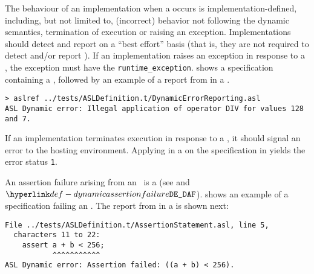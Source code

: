  The behaviour of an implementation when a \dynamicerrorterm{}
occurs is implementation-defined, including, but not limited to,
(incorrect) behavior not following the dynamic semantics, termination of execution or raising an exception.
%
Implementations should detect and report \dynamicerrorsterm{} on a ``best effort'' basis
(that is, they are not required to detect and/or report \dynamicerrorsterm{}).
%
If an implementation raises an exception in response to a \dynamicerrorterm{},
the exception must have the \supertypeterm{}
\verb|runtime_exception|.
%
 shows a specification containing a \dynamicerrorterm{},
followed by an example of a report from \aslref{} in a \linuxbashshell.


\begin{Verbatim}[fontsize=\footnotesize, frame=single]
> aslref ../tests/ASLDefinition.t/DynamicErrorReporting.asl
ASL Dynamic error: Illegal application of operator DIV for values 128 and 7.
\end{Verbatim}

If an implementation terminates execution in response to a \dynamicerrorterm{},
it should signal an error to the hosting environment.
%
Applying \aslref{} in a \linuxbashshell{} on the specification in 
yields the error status \texttt{1}.

An assertion failure arising from an \assertionstatementterm\ is a \dynamicerrorterm{}
(see  and \errorcodeterm{} $\DynamicAssertionFailure$).
%
 shows an example of a specification failing
an \assertionstatementterm{}.
The report from \aslref{} in a \linuxbashshell{} is shown next:
\begin{Verbatim}[fontsize=\footnotesize, frame=single]
File ../tests/ASLDefinition.t/AssertionStatement.asl, line 5,
  characters 11 to 22:
    assert a + b < 256;
           ^^^^^^^^^^^
ASL Dynamic error: Assertion failed: ((a + b) < 256).
\end{Verbatim}

